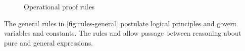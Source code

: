 \begin{figure}
\begin{mdframed}
\begin{mathpar}




    \end{mathpar}

  \end{mdframed}
  \caption{Operational proof rules}
  \label{fig:rules-operational}
\end{figure}

The general rules in \cref{fig:rules-general} postulate logical principles and govern variables and constants. The rules  and  allow passage between reasoning about pure and general expressions.

